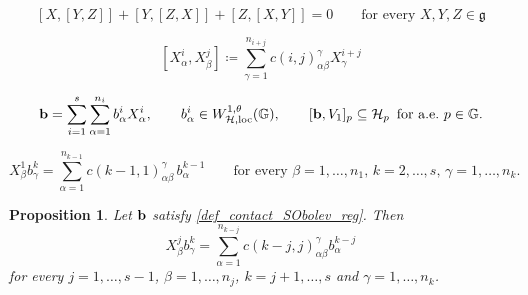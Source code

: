 \documentclass[10pt,a4paper]{amsart}
\newtheorem{proposition}{Proposition}
\newcommand{\bb}{{\bf {b}}} %
\newcommand{\hhh}{{\mathcal{H}}}
\begin{document}
\begin{equation} \label{eq_Jacobi}
[X,[Y,Z]]+[Y,[Z,X]]+[Z,[X,Y]]=0 \qquad \text{for every $X,Y,Z \in\mathfrak{g}$}
\end{equation}

\begin{equation} \label{eq_structural_constants}
\left[X^i_\alpha,X^j_\beta\right] \coloneqq \sum_{\gamma=1}^{n_{i+j}} c(i,j)^\gamma_{\alpha \beta} X^{i+j}_\gamma
\end{equation}

\begin{equation}\label{def_contact_SObolev_reg}
    \bb=\sum_{i=1}^s\sum_{\alpha=1}^{n_i}b^i_\alpha X^i_\alpha,\qquad b^i_\alpha\in W^{1,\theta}_{\hhh,\mathrm{loc}}(\mathbb G),\qquad [\bb,V_1]_p\subseteq\hhh_p\,\text{ for a.e.~$p\in\mathbb G$.}
\end{equation}

\begin{equation} \label{eq_contact_components_first}
X^1_\beta b^k_\gamma = \sum_{\alpha=1}^{n_{k-1}} c(k-1,1)^\gamma_{\alpha \beta} \, b^{k-1}_\alpha\qquad \text{for every $\beta=1,\dots,n_1$, $k=2,\dots,s$, $\gamma=1,\dots,n_k$.}
\end{equation}

\begin{proposition} \label{prop_contact_components}
  Let $\bb$ satisfy \eqref{def_contact_SObolev_reg}. Then
\begin{equation} \label{eq_contact_components}
X^j_\beta b^k_\gamma = \sum_{\alpha=1}^{n_{k-j}} c(k-j,j)^\gamma_{\alpha \beta} b^{k-j}_\alpha
\end{equation}
for every $j=1,\dots,s-1$, $\beta=1,\dots,n_j$, $k=j+1,\dots,s$ and $\gamma=1,\dots,n_k$.
\end{proposition}
\end{document}
